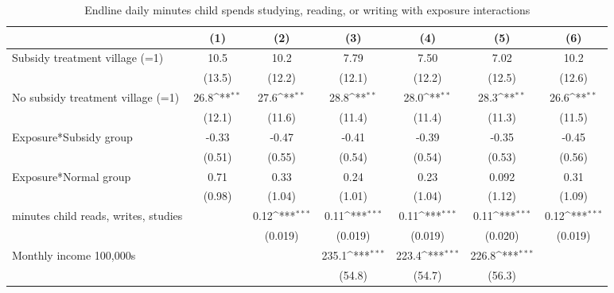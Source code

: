 \begin{table}[htbp]\centering
\def\sym#1{\ifmmode^{#1}\else\(^{#1}\)\fi}
\caption{Endline daily minutes child spends studying, reading, or writing with exposure interactions}
\begin{tabular*}{1\hsize}{@{\hskip\tabcolsep\extracolsep\fill}l*{6}{c}}
\toprule
                &\multicolumn{1}{c}{(1)}         &\multicolumn{1}{c}{(2)}         &\multicolumn{1}{c}{(3)}         &\multicolumn{1}{c}{(4)}         &\multicolumn{1}{c}{(5)}         &\multicolumn{1}{c}{(6)}         \\
\midrule
Subsidy treatment village (=1)&     10.5         &     10.2         &     7.79         &     7.50         &     7.02         &     10.2         \\
                &   (13.5)         &   (12.2)         &   (12.1)         &   (12.2)         &   (12.5)         &   (12.6)         \\
No subsidy treatment village (=1)&     26.8\sym{**} &     27.6\sym{**} &     28.8\sym{**} &     28.0\sym{**} &     28.3\sym{**} &     26.6\sym{**} \\
                &   (12.1)         &   (11.6)         &   (11.4)         &   (11.4)         &   (11.3)         &   (11.5)         \\
Exposure*Subsidy group&    -0.33         &    -0.47         &    -0.41         &    -0.39         &    -0.35         &    -0.45         \\
                &   (0.51)         &   (0.55)         &   (0.54)         &   (0.54)         &   (0.53)         &   (0.56)         \\
Exposure*Normal group&     0.71         &     0.33         &     0.24         &     0.23         &    0.092         &     0.31         \\
                &   (0.98)         &   (1.04)         &   (1.01)         &   (1.04)         &   (1.12)         &   (1.09)         \\
minutes child reads, writes, studies&                  &     0.12\sym{***}&     0.11\sym{***}&     0.11\sym{***}&     0.11\sym{***}&     0.12\sym{***}\\
                &                  &  (0.019)         &  (0.019)         &  (0.019)         &  (0.020)         &  (0.019)         \\
Monthly income 100,000s&                  &                  &    235.1\sym{***}&    223.4\sym{***}&    226.8\sym{***}&                  \\
                &                  &                  &   (54.8)         &   (54.7)         &   (56.3)         &                  \\

\end{tabular*}
\end{table}
